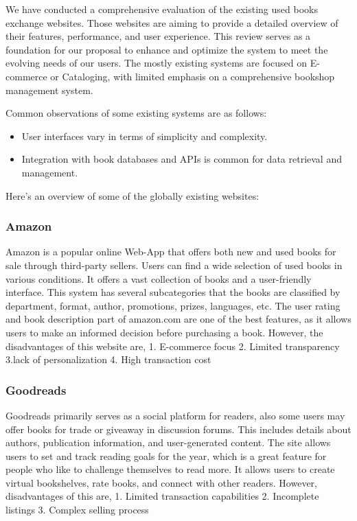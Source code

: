 
We have conducted a comprehensive evaluation of the existing used books
exchange websites. Those websites are aiming to provide a detailed overview of
their features, performance, and user experience. This review serves as a
foundation for our proposal to enhance and optimize the system to meet the
evolving needs of our users. The mostly existing systems are focused on
E-commerce or Cataloging, with limited emphasis on a comprehensive bookshop
management system.

Common observations of some existing systems are as follows:
\begin{itemize}
    \item User interfaces vary in terms of simplicity and complexity.
    \item Integration with book databases and APIs is common for data retrieval and
          management.
\end{itemize}

Here's an overview of some of the globally existing websites:

\subsubsection{Amazon}
Amazon is a popular online Web-App that offers both new and used books for sale
through third-party sellers. Users can find a wide selection of used books in
various conditions. It offers a vast collection of books and a user-friendly
interface. This system has several subcategories that the books are classified
by department, format, author, promotions, prizes, languages, etc. The user
rating and book description part of amazon.com are one of the best features, as
it allows users to make an informed decision before purchasing a book. However,
the disadvantages of this website are, 1. E-commerce focus 2. Limited
transparency 3.lack of personalization 4. High transaction cost

\subsubsection{Goodreads}
Goodreads primarily serves as a social platform for readers, also some users
may offer books for trade or giveaway in discussion forums. This includes
details about authors, publication information, and user-generated content. The
site allows users to set and track reading goals for the year, which is a great
feature for people who like to challenge themselves to read more. It allows
users to create virtual bookshelves, rate books, and connect with other
readers. However, disadvantages of this are, 1. Limited transaction
capabilities 2. Incomplete listings 3. Complex selling process

